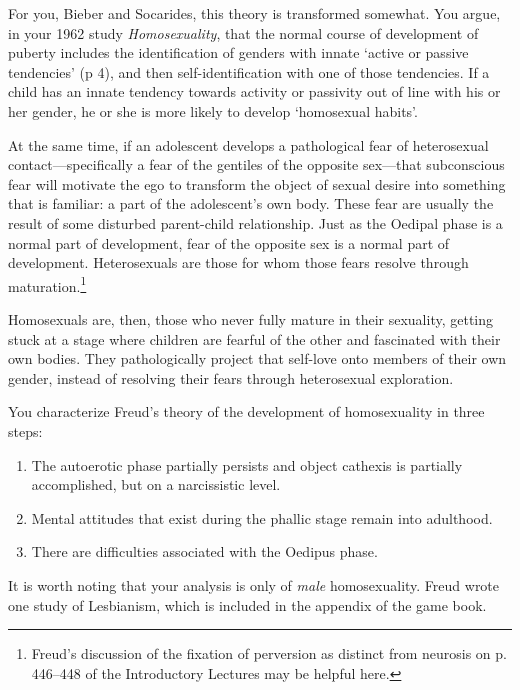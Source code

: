 \begin{refsection}
For you, Bieber and Socarides, this theory is transformed somewhat. You argue, in your 1962 study \emph{Homosexuality}, that the normal course of development of puberty includes the identification of genders with innate `active or passive tendencies' (p 4), and then self-identification with one of those tendencies. If a child has an innate tendency towards activity or passivity out of line with his or her gender, he or she is more likely to develop `homosexual habits'.

At the same time, if an adolescent develops a pathological fear of heterosexual contact---specifically a fear of the gentiles of the opposite sex---that subconscious fear will motivate the ego to transform the object of sexual desire into something that is familiar: a part of the adolescent's own body. These fear are usually the result of some disturbed parent-child relationship. Just as the Oedipal phase is a normal part of development, fear of the opposite sex is a normal part of development. Heterosexuals are those for whom those fears resolve through maturation.\footnote{Freud's discussion of the fixation of perversion as distinct from neurosis on p. 446--448 of the Introductory Lectures may be helpful here.}

Homosexuals are, then, those who never fully mature in their sexuality, getting stuck at a stage where children are fearful of the other and fascinated with their own bodies. They pathologically project that self-love onto members of their own gender, instead of resolving their fears through heterosexual exploration.

You characterize Freud's theory of the development of homosexuality in three steps:

\begin{enumerate}
\item The autoerotic phase partially persists and object cathexis is partially accomplished, but on a narcissistic level.

\item Mental attitudes that exist during the phallic stage remain into adulthood.

\item There are difficulties associated with the Oedipus phase.

\end{enumerate}

It is worth noting that your analysis is only of \emph{male} homosexuality. Freud wrote one study of Lesbianism, which is included in the appendix of the game book.


\end{refsection}
